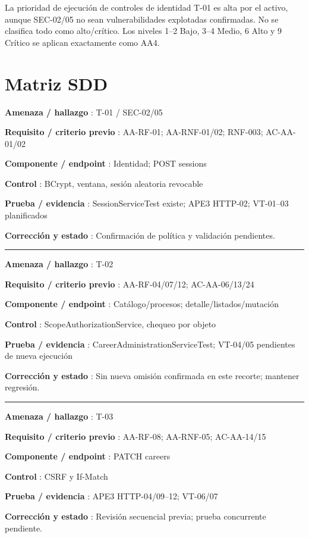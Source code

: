 \documentclass[12pt,a4paper]{report}
\begin{document}
La prioridad de ejecución de controles de identidad T-01 es alta por el
activo, aunque SEC-02/05 no sean vulnerabilidades explotadas
confirmadas. No se clasifica todo como alto/crítico. Los niveles 1--2
Bajo, 3--4 Medio, 6 Alto y 9 Crítico se aplican exactamente como AA4.

\section{Matriz SDD}\label{ACD4-semana-4-anexo1-matriz-sdd}

\textbf{Amenaza / hallazgo }: T-01 / SEC-02/05

\textbf{Requisito / criterio previo }: AA-RF-01; AA-RNF-01/02; RNF-003;
AC-AA-01/02

\textbf{Componente / endpoint }: Identidad; POST sessions

\textbf{Control }: BCrypt, ventana, sesión aleatoria revocable

\textbf{Prueba / evidencia }: SessionServiceTest existe; APE3 HTTP-02;
VT-01--03 planificados

\textbf{Corrección y estado }: Confirmación de política y validación
pendientes.

\medskip\hrule\medskip

\textbf{Amenaza / hallazgo }: T-02

\textbf{Requisito / criterio previo }: AA-RF-04/07/12; AC-AA-06/13/24

\textbf{Componente / endpoint }: Catálogo/procesos;
detalle/listados/mutación

\textbf{Control }: ScopeAuthorizationService, chequeo por objeto

\textbf{Prueba / evidencia }: CareerAdministrationServiceTest; VT-04/05
pendientes de nueva ejecución

\textbf{Corrección y estado }: Sin nueva omisión confirmada en este
recorte; mantener regresión.

\medskip\hrule\medskip

\textbf{Amenaza / hallazgo }: T-03

\textbf{Requisito / criterio previo }: AA-RF-08; AA-RNF-05; AC-AA-14/15

\textbf{Componente / endpoint }: PATCH careers

\textbf{Control }: CSRF y If-Match

\textbf{Prueba / evidencia }: APE3 HTTP-04/09--12; VT-06/07

\textbf{Corrección y estado }: Revisión secuencial previa; prueba
concurrente pendiente.
\end{document}
